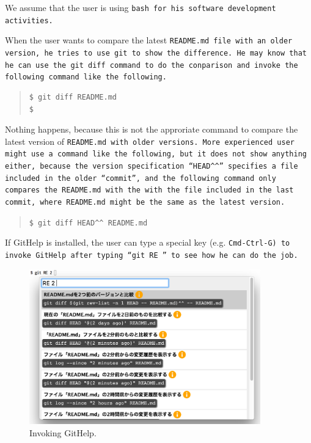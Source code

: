 \documentclass{sigchi}
\def\GH{\textsf{GitHelp}}
\begin{document}
We assume that the user is using \tt{bash} for his software
development activities.


When the user wants to compare the latest \tt{README.md} file with an
older version, he tries to use \tt{git} to show the difference.
He may know that he can use the \tt{git diff} command to do the
conparison and invoke the following command like the following.

\begin{quotation}
\begin{verbatim}
$ git diff README.md
$
\end{verbatim}
\end{quotation}

Nothing happens, because this is not the approriate command
to compare the latest version of \tt{README.md}
with older versions.
%
More experienced user might use a command like the following,
but it does not show anything either, because the version specification
``\verb|HEAD^^|''
specifies a file included in the older ``commit'',
and the following command only compares the \tt{README.md}
with the with the file included in the last commit, where
\tt{README.md} might be the same as the latest version.

\begin{quotation}
  \verb|$ git diff HEAD^^ README.md|
\end{quotation}

If {\GH} is installed,
the user can type a special key (e.g. \tt{Cmd-Ctrl-G}) to invoke {\GH}
after typing ``\verb|git RE |'' to see how he can do the job.

\begin{figure}[h]
  \includegraphics[width=10cm,bb=-100 -100 1190 766]{figures/githelp1.png}
  \caption{Invoking {\GH}.}
  \label{bash1}
\end{figure}
\end{document}
